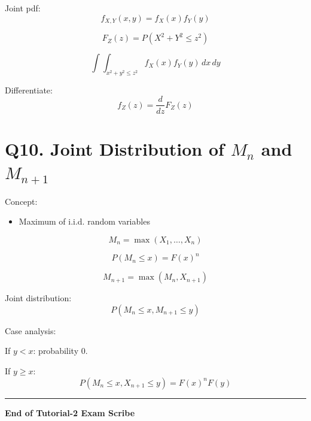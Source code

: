 \documentclass[11pt]{article}
\begin{document}
Joint pdf:
\[
f_{X,Y}(x,y)=f_X(x)f_Y(y)
\]

\[
F_Z(z)=P(X^2+Y^2 \le z^2)
\]

\[
\int\int_{x^2+y^2\le z^2}
f_X(x)f_Y(y)\,dx\,dy
\]

Differentiate:
\[
f_Z(z)
=
\frac{d}{dz}F_Z(z)
\]

\section*{Q10. Joint Distribution of $M_n$ and $M_{n+1}$}

Concept:
\begin{itemize}
\item Maximum of i.i.d. random variables
\end{itemize}

\[
M_n=\max(X_1,\dots,X_n)
\]

\[
P(M_n\le x)
=
F(x)^n
\]

\[
M_{n+1}=\max(M_n, X_{n+1})
\]

Joint distribution:
\[
P(M_n\le x, M_{n+1}\le y)
\]

Case analysis:

If $y<x$: probability 0.

If $y\ge x$:
\[
P(M_n\le x, X_{n+1}\le y)
=
F(x)^n F(y)
\]

\vspace{0.5cm}
\hrule
\vspace{0.3cm}

\begin{center}
\textbf{End of Tutorial-2 Exam Scribe}
\end{center}
\end{document}

